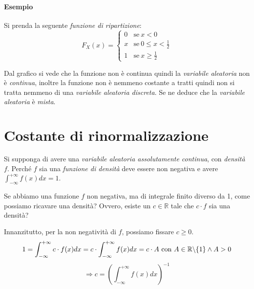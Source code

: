 \documentclass[12pt, a4paper]{report}
\theoremstyle{definition}
\DeclareRobustCommand{\R}{\mathbb{R}}%
\begin{document}
\paragraph*{Esempio}
Si prenda la seguente \emph{funzione di ripartizione}:
\[F_X(x)=\begin{cases}
	{0} & \text{se}\ {x<0}\\
	{x} & \text{se}\ {0\leq x<\frac{1}{2}}\\
	{1} & \text{se}\ {x\geq \frac{1}{2}}
\end{cases}\]

\begin{center}
\end{center}
Dal grafico si vede che la funzione non è continua quindi la \emph{variabile
aleatoria} non è \emph{continua}, inoltre la funzione non è nemmeno costante a
tratti quindi non si tratta nemmeno di una \emph{variabile aleatoria discreta}.
Se ne deduce che la \emph{variabile aleatoria} è \emph{mista}.

\section{Costante di rinormalizzazione}
Si supponga di avere una \emph{variabile aleatoria assolutamente continua}, con
\emph{densità} $f$. Perché $f$ sia una \emph{funzione di densità} deve essere
non negativa e avere \(\int_{-\infty}^{+\infty}f(x)dx=1\).

Se abbiamo una funzione $f$ non negativa, ma di integrale finito diverso da 1,
come possiamo ricavare una densità? Ovvero, esiste un $c\in\R$ tale che $c\cdot f$
sia una densità?

Innanzitutto, per la non negatività di $f$, possiamo fissare $c\geq 0$.
\[1=\int_{-\infty}^{+\infty}c\cdot f(x)dx=c\cdot \int_{-\infty}^{+\infty}f(x)dx=c\cdot A\ \text
{con $A\in\R\symbol{92}\{1\}\wedge A>0$}\]
\[\Rightarrow c=\left(\int_{-\infty}^{+\infty}f(x)dx\right)^{-1}\]
\end{document}
